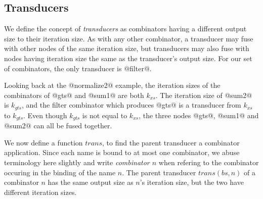 


\subsection{Transducers}

We define the concept of \emph{transducers} as combinators having a different output size to their iteration size.
As with any other combinator, a transducer may fuse with other nodes of the same iteration size, but transducers may also fuse with nodes having iteration size the same as the transducer's output size.
For our set of combinators, the only transducer is @filter@.

Looking back at the @normalize2@ example, the iteration sizes of the combinators of @gts@ and @sum1@ are both $k_{xs}$.
The iteration size of @sum2@ is $k_{gts}$, and the filter combinator which produces @gts@ is a transducer from $k_{xs}$ to $k_{gts}$. 
Even though $k_{gts}$ is not equal to $k_{xs}$, the three nodes @gts@, @sum1@ and @sum2@ can all be fused together.

We now define a function $trans$, to find the parent transducer a combinator application. Since each name is bound to at most one combinator, we abuse terminology here slightly and write \emph{combinator $n$} when refering to the combinator occuring in the binding of the name $n$.
The parent transducer $trans(bs, n)$ of a combinator $n$ has the same output size as $n$'s iteration size, but the two have different iteration sizes.


